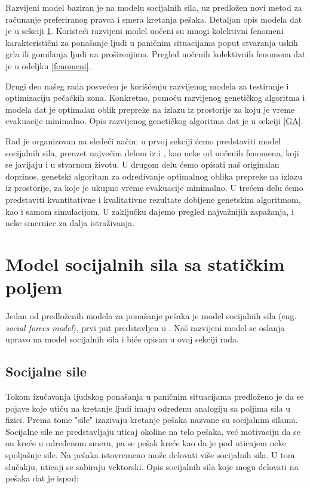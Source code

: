 \documentclass[12pt]{article}
\begin{document}
Razvijeni model baziran je na modelu socijalnih sila, uz predložen novi metod za računanje preferiranog pravca i smera kretanja pešaka. Detaljan opis modela dat je u sekciji \ref{sile}. Koristeći razvijeni model uočeni su mnogi kolektivni fenomeni karakteristični za ponašanje ljudi u paničnim situacijama poput stvaranja uskih grla ili gomilanja ljudi na proširenjima. Pregled uočenih kolektivnih fenomena dat je u odeljku \ref{fenomeni}. 

Drugi deo našeg rada posvećen je korišćenju razvijenog modela za testiranje i optimizaciju pečaćkih zona. Konkretno, pomoću razvijenog genetičkog algoritma i modela dat je optimalan oblik prepreke na izlazu iz prostorije za koju je vreme evakuacije minimalno. Opis razvijenog genetičkog algoritma dat je u sekciji \ref{GA}. 

Rad je organizovan na sledeći način: u prvoj sekciji ćemo predstaviti model socijalnih sila, preuzet najvećim delom iz \citep{Helbing1998} i \citep{Helbing2002}, kao neke od uočenih fenomena, koji se javljaju i u stvarnom životu. U drugom delu ćemo opisati naš originalan doprinos, genetski algoritam za određivanje optimalnog oblika prepreke na izlazu iz prostorije, za koje je ukupno vreme evakuacije minimalno. U trećem delu ćemo predstaviti kvantitativne i kvalitativne rezultate dobijene genetskim algoritmom, kao i samom simulacijom. U zaključku dajemo pregled najvažnijih zapažanja, i neke smernice za dalja istraživanja.

\section{Model socijalnih sila sa statičkim poljem}
\label{sile}

Jedan od predloženih modela za ponašanje pešaka je model socijalnih sila (eng. \emph{social forces model}), prvi put predstavljen u \citep{Helbing1994}. Naš razvijeni model se oslanja upravo na model socijalnih sila i biće opisan u ovoj sekciji rada. 

    \subsection{Socijalne sile}

Tokom izučavanja ljudskog ponašanja u paničnim situacijama predloženo je da se pojave koje utiču na kretanje ljudi imaju određenu analogiju sa poljima sila u fizici. Prema tome "sile" izazivaju kretanje pešaka nazvane su socijalnim silama. Socijalne sile ne predstavljaju uticaj okoline na telo pešaka, već motivaciju da se on kreće u određenom smeru, pa se pešak kreće kao da je pod uticajem neke spoljašnje sile. Na pešaka istovremeno može delovati više socijalnih sila. U tom slučakju, uticaji se sabiraju vektorski. Opis socijalnih sila koje mogu delovati na pešaka dat je ispod:
\end{document}
